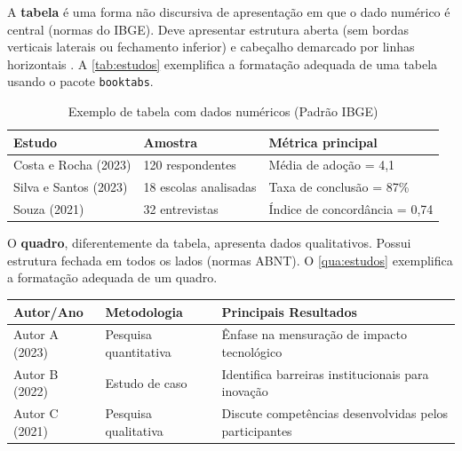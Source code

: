\documentclass[
    12pt,        %
    openany,     %
    oneside,     %
    a4paper,     %
    english,     %
    brazil,      %
    article      %
]{abntex2}
\begin{document}
A \textbf{tabela} é uma forma não discursiva de apresentação em que o dado numérico é central (normas do IBGE). Deve apresentar estrutura aberta (sem bordas verticais laterais ou fechamento inferior) e cabeçalho demarcado por linhas horizontais \cite{ABNT_NBR14724_2011,ABNT_NBR15287_2011}. A \autoref{tab:estudos} exemplifica a formatação adequada de uma tabela usando o pacote \texttt{booktabs}.

\begin{table}[htbp]
    \centering
    \caption{Exemplo de tabela com dados numéricos (Padrão IBGE)}
    \label{tab:estudos}
    \begin{tabularx}{0.8\textwidth}{p{4cm}XX}
        \toprule
        \textbf{Estudo} & \textbf{Amostra} & \textbf{Métrica principal} \\
        \midrule
        Costa e Rocha (2023) & 120 respondentes & Média de adoção = 4,1 \\
        Silva e Santos (2023) & 18 escolas analisadas & Taxa de conclusão = 87\% \\
        Souza (2021) & 32 entrevistas & Índice de concordância = 0,74 \\
        \bottomrule
    \end{tabularx}
\end{table}

O \textbf{quadro}, diferentemente da tabela, apresenta dados qualitativos. Possui estrutura fechada em todos os lados (normas ABNT). O \autoref{qua:estudos} exemplifica a formatação adequada de um quadro.

\begin{quadro}[htbp]
    \centering
    \caption{Exemplo de quadro com conteúdo qualitativo (Padrão ABNT)}
    \label{qua:estudos}
    \begin{tabularx}{\textwidth}{|p{3cm}|p{4cm}|X|}
        \hline
        \textbf{Autor/Ano} & \textbf{Metodologia} & \textbf{Principais Resultados} \\
        \hline
        Autor A (2023) & Pesquisa quantitativa & Ênfase na mensuração de impacto tecnológico \\ \hline
        Autor B (2022) & Estudo de caso & Identifica barreiras institucionais para inovação \\ \hline
        Autor C (2021) & Pesquisa qualitativa & Discute competências desenvolvidas pelos participantes \\ \hline
    \end{tabularx}
\end{quadro}
\end{document}
